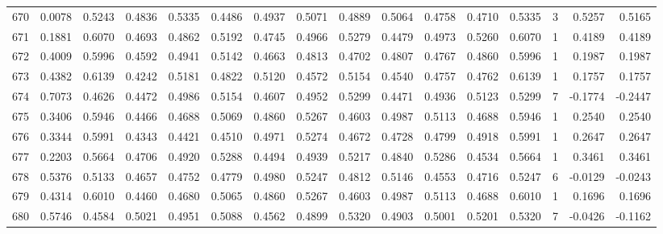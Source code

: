 \begin{tabular}{lrrrrrrrrrrrrrrr}
670 &      0.0078 &  0.5243 &  0.4836 &  0.5335 &  0.4486 &  0.4937 &  0.5071 &  0.4889 &  0.5064 &  0.4758 &   0.4710 &     0.5335 &      3 &                    0.5257 &                     0.5165 \\
671 &      0.1881 &  0.6070 &  0.4693 &  0.4862 &  0.5192 &  0.4745 &  0.4966 &  0.5279 &  0.4479 &  0.4973 &   0.5260 &     0.6070 &      1 &                    0.4189 &                     0.4189 \\
672 &      0.4009 &  0.5996 &  0.4592 &  0.4941 &  0.5142 &  0.4663 &  0.4813 &  0.4702 &  0.4807 &  0.4767 &   0.4860 &     0.5996 &      1 &                    0.1987 &                     0.1987 \\
673 &      0.4382 &  0.6139 &  0.4242 &  0.5181 &  0.4822 &  0.5120 &  0.4572 &  0.5154 &  0.4540 &  0.4757 &   0.4762 &     0.6139 &      1 &                    0.1757 &                     0.1757 \\
674 &      0.7073 &  0.4626 &  0.4472 &  0.4986 &  0.5154 &  0.4607 &  0.4952 &  0.5299 &  0.4471 &  0.4936 &   0.5123 &     0.5299 &      7 &                   -0.1774 &                    -0.2447 \\
675 &      0.3406 &  0.5946 &  0.4466 &  0.4688 &  0.5069 &  0.4860 &  0.5267 &  0.4603 &  0.4987 &  0.5113 &   0.4688 &     0.5946 &      1 &                    0.2540 &                     0.2540 \\
676 &      0.3344 &  0.5991 &  0.4343 &  0.4421 &  0.4510 &  0.4971 &  0.5274 &  0.4672 &  0.4728 &  0.4799 &   0.4918 &     0.5991 &      1 &                    0.2647 &                     0.2647 \\
677 &      0.2203 &  0.5664 &  0.4706 &  0.4920 &  0.5288 &  0.4494 &  0.4939 &  0.5217 &  0.4840 &  0.5286 &   0.4534 &     0.5664 &      1 &                    0.3461 &                     0.3461 \\
678 &      0.5376 &  0.5133 &  0.4657 &  0.4752 &  0.4779 &  0.4980 &  0.5247 &  0.4812 &  0.5146 &  0.4553 &   0.4716 &     0.5247 &      6 &                   -0.0129 &                    -0.0243 \\
679 &      0.4314 &  0.6010 &  0.4460 &  0.4680 &  0.5065 &  0.4860 &  0.5267 &  0.4603 &  0.4987 &  0.5113 &   0.4688 &     0.6010 &      1 &                    0.1696 &                     0.1696 \\
680 &      0.5746 &  0.4584 &  0.5021 &  0.4951 &  0.5088 &  0.4562 &  0.4899 &  0.5320 &  0.4903 &  0.5001 &   0.5201 &     0.5320 &      7 &                   -0.0426 &                    -0.1162 \\

\end{tabular}
